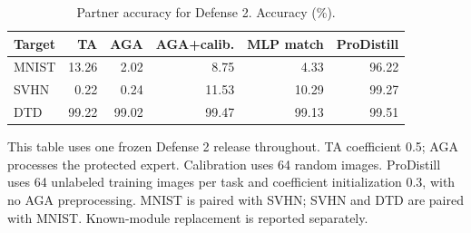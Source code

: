 \begin{table}[t]
\centering\small
\setlength{\tabcolsep}{4pt}
\caption{Partner accuracy for Defense 2. Accuracy (\%).}
\label{tab:defense2_version_partners}
\begin{tabular}{@{}lrrrrr@{}}
\toprule
Target & TA & AGA & AGA+calib. & MLP match & ProDistill \\
\midrule
MNIST & 13.26 & 2.02 & 8.75 & 4.33 & 96.22 \\
\midrule
SVHN & 0.22 & 0.24 & 11.53 & 10.29 & 99.27 \\
\midrule
DTD & 99.22 & 99.02 & 99.47 & 99.13 & 99.51 \\
\bottomrule
\end{tabular}
\par\smallskip
\begin{minipage}{\textwidth}\footnotesize This table uses one frozen Defense 2 release throughout. TA coefficient 0.5; AGA processes the protected expert. Calibration uses 64 random images. ProDistill uses 64 unlabeled training images per task and coefficient initialization 0.3, with no AGA preprocessing. MNIST is paired with SVHN; SVHN and DTD are paired with MNIST. Known-module replacement is reported separately.\end{minipage}
\end{table}
